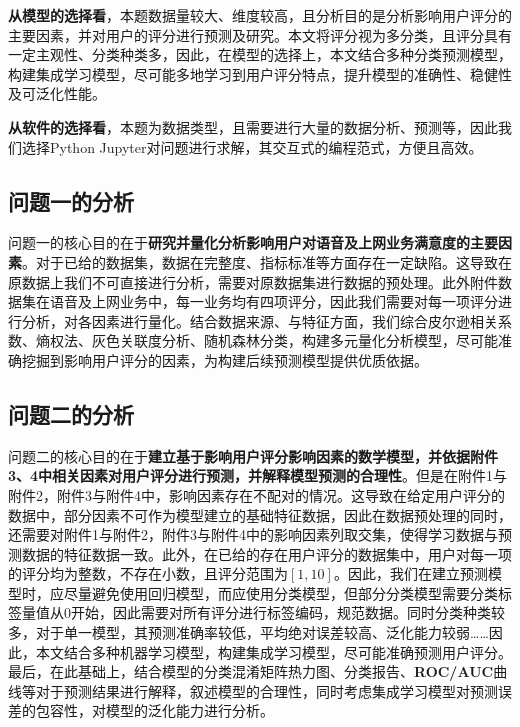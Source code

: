 \documentclass{MathorCupmodeling}
\begin{document}
	\textbf{从模型的选择看}，本题数据量较大、维度较高，且分析目的是分析影响用户评分的主要因素，并对用户的评分进行预测及研究。本文将评分视为多分类，且评分具有一定主观性、分类种类多，因此，在模型的选择上，本文结合多种分类预测模型，构建集成学习模型，尽可能多地学习到用户评分特点，提升模型的准确性、稳健性及可泛化性能。

	\textbf{从软件的选择看}，本题为数据类型，且需要进行大量的数据分析、预测等，因此我们选择Python Jupyter对问题进行求解，其交互式的编程范式，方便且高效。
	\subsection{问题一的分析}
	问题一的核心目的在于\textbf{研究并量化分析影响用户对语音及上网业务满意度的主要因素}。对于已给的数据集，数据在完整度、指标标准等方面存在一定缺陷。这导致在原数据上我们不可直接进行分析，需要对原数据集进行数据的预处理。此外附件数据集在语音及上网业务中，每一业务均有四项评分，因此我们需要对每一项评分进行分析，对各因素进行量化。结合数据来源、与特征方面，我们综合{\heiti 皮尔逊相关系数}、{\heiti 熵权法}、{\heiti 灰色关联度分析}、{\heiti 随机森林分类}，构建多元量化分析模型，尽可能准确挖掘到影响用户评分的因素，为构建后续预测模型提供优质依据。
	\subsection{问题二的分析}
	问题二的核心目的在于\textbf{建立基于影响用户评分影响因素的数学模型，并依据附件3、4中相关因素对用户评分进行预测，并解释模型预测的合理性}。但是在附件1与附件2，附件3与附件4中，影响因素存在不配对的情况。这导致在给定用户评分的数据中，部分因素不可作为模型建立的基础特征数据，因此在数据预处理的同时，还需要对附件1与附件2，附件3与附件4中的{\heiti 影响因素列取交集}，使得学习数据与预测数据的特征数据一致。此外，在已给的存在用户评分的数据集中，用户对每一项的评分均为整数，不存在小数，且评分范围为$\left[1,10\right]$。因此，我们在建立预测模型时，应尽量避免使用回归模型，而应使用{\heiti 分类模型}，但部分分类模型需要分类标签量值从$0$开始，因此需要对所有评分进行标签编码，规范数据。同时分类种类较多，对于单一模型，其预测准确率较低，平均绝对误差较高、泛化能力较弱……因此，本文结合多种机器学习模型，构建{\heiti 集成学习模型}，尽可能准确预测用户评分。最后，在此基础上，结合模型的{\heiti 分类混淆矩阵热力图}、{\heiti 分类报告}、\textbf{ROC/AUC}{\heiti 曲线}等对于预测结果进行解释，叙述模型的合理性，同时考虑集成学习模型对预测误差的包容性，对模型的泛化能力进行分析。
\end{document}
